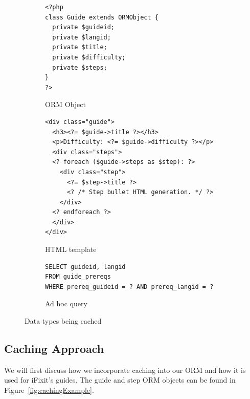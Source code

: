 \documentclass[12pt]{ucthesis}
\begin{document}
\begin{figure}[hbtp]
\begin{subfigure}[b]{1.0\textwidth}
\begin{ssp}
\begin{verbatim}
<?php
class Guide extends ORMObject {
  private $guideid;
  private $langid;
  private $title;
  private $difficulty;
  private $steps;
}
?>
\end{verbatim}
\caption{ORM Object}
\label{fig:ormObject}
\end{ssp}
\end{subfigure}

\vspace{2em}
\begin{subfigure}[b]{1.0\textwidth}
\begin{ssp}
\begin{verbatim}
<div class="guide">
  <h3><?= $guide->title ?></h3>
  <p>Difficulty: <?= $guide->difficulty ?></p>
  <div class="steps">
  <? foreach ($guide->steps as $step): ?>
    <div class="step">
      <?= $step->title ?>
      <? /* Step bullet HTML generation. */ ?>
    </div>
  <? endforeach ?>
  </div>
</div>
\end{verbatim}
\caption{HTML template}
\label{fig:htmlTemplate}
\end{ssp}
\end{subfigure}

\vspace{2em}
\begin{subfigure}[b]{1.0\textwidth}
\begin{ssp}
\begin{verbatim}
SELECT guideid, langid
FROM guide_prereqs
WHERE prereq_guideid = ? AND prereq_langid = ?
\end{verbatim}
\caption{Ad hoc query}
\label{fig:adHocQuery}
\end{ssp}
\end{subfigure}

\caption{Data types being cached}
\label{fig:dataBeingCached}
\end{figure}

\subsection{Caching Approach}
We will first discuss how we incorporate caching into our ORM and how it is used for \textsf{iFixit}'s guides.
The guide and step ORM objects can be found in Figure~\ref{fig:cachingExample}.
\end{document}
